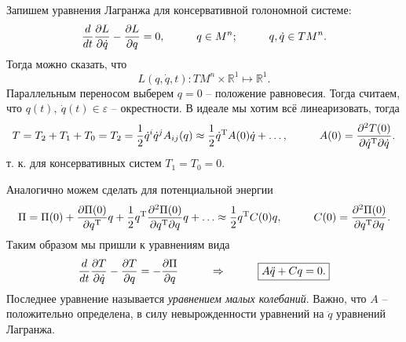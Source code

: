 Запишем уравнения Лагранжа для консервативной голономной системе:
\begin{equation*}
    \frac{d }{d t} \frac{\partial L}{\partial \dot{q}} - \frac{\partial L}{\partial q} = 0,
    \hspace{1 cm}
    q \in  M^n;
    \hspace{1 cm}
    q, \dot{q} \in T M^n.
\end{equation*}
Тогда можно сказать, что
\begin{equation*}
    L(q, \dot{q}, t) \colon TM^n \times \mathbb{R}^1 \mapsto \mathbb{R}^1.
\end{equation*}
Параллельным переносом выберем $q=0$ -- положение равновесия. Тогда считаем, что $q(t), \ \dot{q}(t) \in \varepsilon$ -- окрестности. В идеале мы хотим всё линеаризовать, тогда 
\begin{equation*}
    T = T_2 + T_1 + T_0 = T_2 = \frac{1}{2} \dot{q}^i \dot{q}^j A_{ij} (q) \approx \frac{1}{2} \dot{q}^{\text{T}} A(0) \dot{q} + \ldots,
    \hspace{1 cm}
    A(0) = \frac{\partial^2 T(0)}{\partial \dot{q}^{\text{T}} \partial \dot{q}}.
\end{equation*}
 т. к. для консервативных систем $T_1 = T_0 = 0$. 

Аналогично можем сделать для потенциальной энергии
\begin{equation*}
    \Pi = \Pi (0) + \frac{\partial \Pi(0)}{\partial q^{\text{T}}} q 
    + \frac{1}{2} q^{\text{T}} \frac{\partial^2 \Pi (0)}{\partial q^{\text{T}} \partial q} q + \ldots
    \approx \frac{1}{2} q^{\text{T}} C(0) q,
    \hspace{1 cm}
    C(0) = \frac{\partial^2 \Pi(0)}{\partial q^{\text{T}} \partial q}.
\end{equation*}
Таким образом мы пришли к уравнениям вида
\begin{equation*}
    \frac{d }{d t} \frac{\partial T}{\partial \dot{q}} - \frac{\partial T}{\partial q} = - \frac{\partial \Pi}{\partial q} 
    \hspace{1 cm} \Rightarrow \hspace{1 cm}
    \boxed{
    A \ddot{q} + C q = 0.
    }
\end{equation*}
Последнее уравнение называется \textit{уравнением малых колебаний}. Важно, что $A$ -- положительно определена,  в силу невырожденности уравнений на $\ddot{q}$ уравнений Лагранжа.

